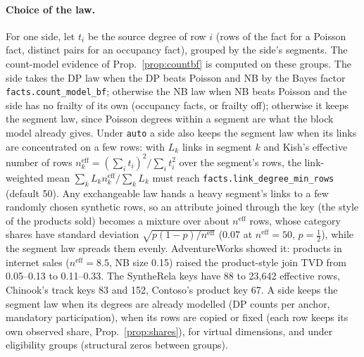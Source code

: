 \paragraph{Choice of the law.} For one side, let $t_i$ be the source degree of row $i$ (rows of the fact for a Poisson fact, distinct pairs for an occupancy fact), grouped by the side's segments. The count-model evidence of Prop.~\ref{prop:countbf} is computed on these groups. The side takes the DP law when the DP beats Poisson and NB by the Bayes factor \texttt{facts.count\_model\_bf}; otherwise the NB law when NB beats Poisson and the side has no frailty of its own (occupancy facts, or frailty off); otherwise it keeps the segment law, since Poisson degrees within a segment are what the block model already gives. Under \texttt{auto} a side also keeps the segment law when its links are concentrated on a few rows: with $L_k$ links in segment $k$ and Kish's effective number of rows $n^{\mathrm{eff}}_k=(\sum_i t_i)^2/\sum_i t_i^2$ over the segment's rows, the link-weighted mean $\sum_k L_k n^{\mathrm{eff}}_k/\sum_k L_k$ must reach \texttt{facts.link\_degree\_min\_rows} (default 50). Any exchangeable law hands a heavy segment's links to a few randomly chosen synthetic rows, so an attribute joined through the key (the style of the products sold) becomes a mixture over about $n^{\mathrm{eff}}$ rows, whose category shares have standard deviation $\sqrt{p(1-p)/n^{\mathrm{eff}}}$ (0.07 at $n^{\mathrm{eff}}=50$, $p=\frac12$), while the segment law spreads them evenly. AdventureWorks showed it: products in internet sales ($n^{\mathrm{eff}}=8.5$, NB size 0.15) raised the product-style join TVD from 0.05--0.13 to 0.11--0.33. The SyntheRela keys have 88 to 23{,}642 effective rows, Chinook's track keys 83 and 152, Contoso's product key 67. A side keeps the segment law when its degrees are already modelled (DP counts per anchor, mandatory participation), when its rows are copied or fixed (each row keeps its own observed share, Prop.~\ref{prop:shares}), for virtual dimensions, and under eligibility groups (structural zeros between groups).

